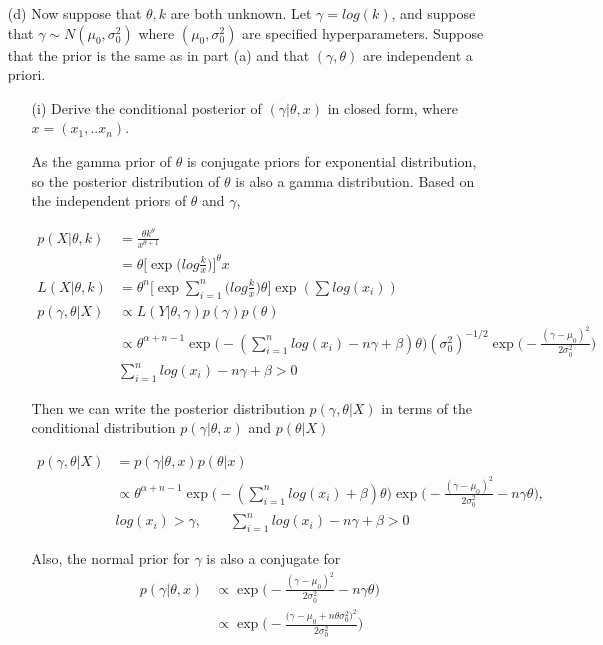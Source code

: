 \begin{itemize}
\item[(d)] Now suppose that $\theta, k$ are both unknown. Let $\gamma = log(k)$, and suppose that $\gamma \sim N(\mu_0, \sigma^2_0)$ where $(\mu_0, \sigma^2_0)$ are specified hyperparameters. Suppose that the prior is the same as in part (a) and that $(\gamma, \theta)$ are independent a priori.

\begin{itemize}
\item[(i)] Derive the conditional posterior of $(\gamma| \theta, x)$ in closed form, where $x= (x_1,.. x_n)$.

As the gamma prior of $\theta$ is conjugate priors for exponential distribution, so the posterior distribution of $\theta$ is also a gamma distribution.
Based on the independent priors of $\theta$ and $\gamma$,

 \begin{align*}
   p(X| \theta, k) & = \frac{\theta k^{\theta}}{x^{\theta + 1}} \\
   &= \theta \Big[ \exp \Big(log \frac{k}{x} \Big) \Big]^{\theta} x \\
   L(X| \theta, k) &= \theta^n \Big[ \exp \sum_{i=1}^n \Big(log \frac{k}{x} \Big) \theta \Big] \exp(\sum log(x_i)) \\
   p(\gamma, \theta | X) & \propto L(Y| \theta, \gamma) p(\gamma) p(\theta) \\
   & \propto \theta^{\alpha + n -1} \exp \Big(- (\sum_{i=1}^n log(x_i) - n \gamma + \beta) \theta \Big) (\sigma_0^2)^{-1/2} \exp \Big(-\frac{(\gamma - \mu_0)^2}{2 \sigma^2_0} \Big) \\
   & \sum_{i=1}^n log(x_i) - n \gamma + \beta > 0
\end{align*}

Then we can write the posterior distribution $p(\gamma, \theta | X)$ in terms of the conditional distribution $p(\gamma | \theta, x)$ and $p(\theta | X)$

 \begin{align*}
   p(\gamma, \theta | X) &= p(\gamma | \theta, x) p(\theta | x) \\ 
  & \propto \theta^{\alpha + n -1} \exp \Big(- (\sum_{i=1}^n log(x_i) + \beta) \theta \Big) \exp \Big(-\frac{(\gamma - \mu_0)^2}{2 \sigma^2_0} - n \gamma \theta \Big) ,\\
 & log(x_i) > \gamma,  \qquad \sum_{i=1}^n log(x_i) - n \gamma + \beta > 0
\end{align*}

Also, the normal prior for $\gamma$ is also a conjugate for 
 \begin{align*}
   p(\gamma | \theta, x) & \propto \exp \Big(-\frac{(\gamma - \mu_0)^2}{2 \sigma^2_0} - n \gamma \theta \Big) \\
   & \propto \exp \Big(-\frac{\Big(\gamma - \mu_0 + n \theta \sigma_0^2 \Big)^2}{2 \sigma^2_0}  \Big) 
 \end{align*}


\end{itemize}
\end{itemize}

